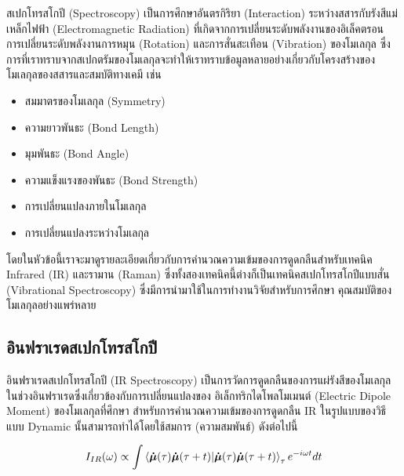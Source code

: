 สเปกโทรสโกปี (Spectroscopy) เป็นการศึกษาอันตรกิริยา (Interaction) ระหว่างสสารกับรังสีแม่เหล็กไฟฟ้า (Electromagnetic Radiation)
ที่เกิดจากการเปลี่ยนระดับพลังงานของอิเล็คตรอน การเปลี่ยนระดับพลังงานการหมุน (Rotation) และการสั่นสะเทือน (Vibration) ของโมเลกุล
ซึ่งการที่เราทราบจากสเปกตรัมของโมเลกุลจะทำให้เราทราบข้อมูลหลายอย่างเกี่ยวกับโครงสร้างของโมเลกุลของสสารและสมบัติทางเคมี เช่น
%
\begin{itemize}[topsep=0pt,noitemsep]\setlength\itemsep{0.5em}
    \item สมมาตรของโมเลกุล (Symmetry)

    \item ความยาวพันธะ (Bond Length)

    \item มุมพันธะ (Bond Angle)

    \item ความแข็งแรงของพันธะ (Bond Strength)

    \item การเปลี่ยนแปลงภายในโมเลกุล

    \item การเปลี่ยนแปลงระหว่างโมเลกุล
\end{itemize}

โดยในหัวข้อนี้เราจะมาดูรายละเอียดเกี่ยวกับการคำนวณความเข้มของการดูดกลืนสำหรับเทคนิค Infrared (IR) และรามาน (Raman)
ซึ่งทั้งสองเทคนิคนี้ต่างก็เป็นเทคนิคสเปกโทรสโกปีแบบสั่น (Vibrational Spectroscopy) ซึ่งมีการนำมาใช้ในการทำงานวิจัยสำหรับการศึกษา%
คุณสมบัติของโมเลกุลอย่างแพร่หลาย

\subsection{อินฟราเรดสเปกโทรสโกปี}
\label{ssec:ir_spectro}

อินฟราเรดสเปกโทรสโกปี (IR Spectroscopy) เป็นการวัดการดูดกลืนของการแผ่รังสีของโมเลกุลในช่วงอินฟราเรดซึ่งเกี่ยวข้องกับการเปลี่ยนแปลงของ%
อิเล็กทริกไดโพลโมเมนต์ (Electric Dipole Moment) ของโมเลกุลที่ศึกษา สำหรับการคำนวณความเข้มของการดูดกลืน IR ในรูปแบบของวิธีแบบ
Dynamic นั้นสามารถทำได้โดยใช้สมการ (ความสมพันธ์) ดังต่อไปนี้\autocite{thomas2013}

\begin{equation}\label{eq:IR_corr}
    I_{IR} (\omega) \propto \int \braket{\bm{\dot{\mu}}(\tau) \bm{\dot{\mu}}(\tau+t)}_{\tau} e^{-i \omega t} dt
\end{equation}


